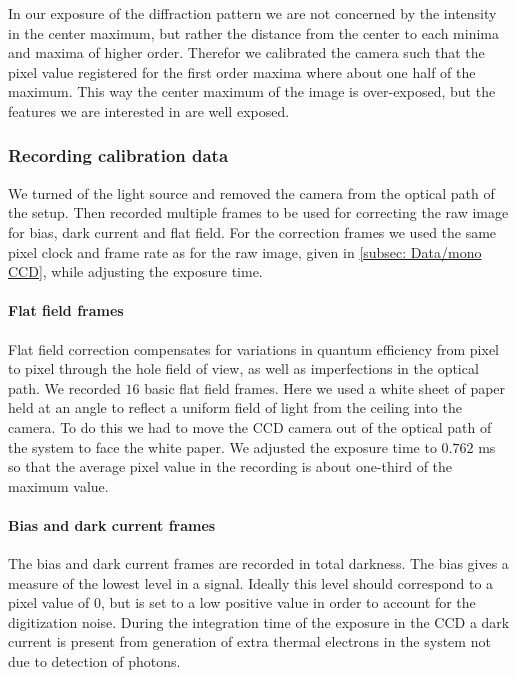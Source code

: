 \documentclass{emulateapj}
\begin{document}
In our exposure of the diffraction pattern we are not concerned by the intensity in the center maximum, but rather the distance from the center to each minima and maxima of higher order. Therefor we calibrated the camera such that the pixel value registered for the first order maxima where about one half of the maximum. This way the center maximum of the image is over-exposed, but the features we are interested in are well exposed.

\subsubsection{Recording calibration data}
\label{subsubsec: Method/Calibration data}
We turned of the light source and removed the camera from the optical path of the setup. Then recorded multiple frames to be used for correcting the raw image for bias, dark current and flat field. For the correction frames we used the same pixel clock and frame rate as for the raw image, given in \cref{subsec: Data/mono CCD}, while adjusting the exposure time.

\paragraph{Flat field frames}
Flat field correction compensates for variations in quantum efficiency from pixel to pixel through the hole field of view, as well as imperfections in the optical path. We recorded $16$ basic flat field frames. Here we used a white sheet of paper held at an angle to reflect a uniform field of light from the ceiling into the camera. To do this we had to move the CCD camera out of the optical path of the system to face the white paper. We adjusted the exposure time to $0.762$ ms so that the average pixel value in the recording is about one-third of the maximum value.

\paragraph{Bias and dark current frames}
The bias and dark current frames are recorded in total darkness. The bias gives a measure of the lowest level in a signal. Ideally this level should correspond to a pixel value of $0$, but is set to a low positive value in order to account for the digitization noise. During the integration time of the exposure in the CCD a dark current is present from generation of extra thermal electrons in the system not due to detection of photons.
\end{document}
